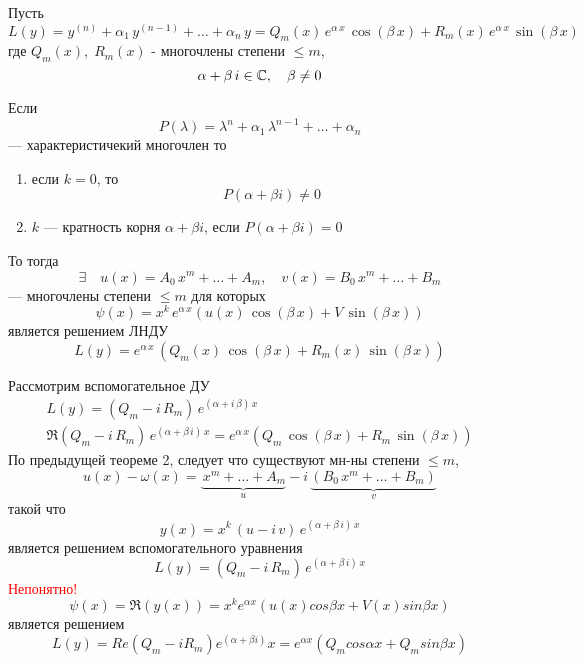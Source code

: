 \begin{Th}
    Пусть 
    \[
        L(y)=y^{(n)} + \alpha_1\,y^{(n-1)} + \dots +\alpha_n\,y=Q_m(x)\,e^{\alpha\,x}\,\cos(\beta\,x) + R_m(x)\,e^{\alpha\,x}\,\sin(\beta\,x)
    \] 
    где $Q_m(x),\; R_m(x)$ - многочлены степени $\leqslant m$, 
    \[
        \alpha + \beta\,i \in \mathbb{C},\quad \beta \neq 0
    \]
    
    Если 
    \[
        P(\lambda) = \lambda^n + \alpha_1\,\lambda^{n-1} + \dots + \alpha_n
    \] 
    --- характеристичекий многочлен то
    \begin{enumerate}
        \item[\textbullet] если $k=0$, то
        \[
            P(\alpha + \beta i) \neq 0
        \] 
                
        \item[\textbullet] $k$ --- кратность корня $\alpha + \beta i$, если $P(\alpha + \beta i) = 0$
    \end{enumerate}
	То тогда 
    \[
        \exists \quad u(x)= A_0\,x^m + \dots + A_m, \quad v(x) = B_0\,x^m + \dots + B_m 
    \]
    --- многочлены степени $\leqslant m$ для которых 
    \[
        \psi(x) = x^k\,e^{\alpha\,x}(u(x)\,\cos(\beta\,x) + V\,\sin(\beta\,x))
    \]
    является решением ЛНДУ 
    \[
        L(y) = e^{\alpha\,x}\,(Q_m(x)\,\cos(\beta\,x) + R_m(x)\,\sin(\beta\,x))
    \]
\end{Th}

\begin{Proof}
    Рассмотрим вспомогательное ДУ 
    \begin{gather*}
        L(y) = (Q_m - i\,R_m)\,e^{(\alpha + i\,\beta)\,x}\\
        \Re (Q_m - i\,R_m)\,e^{(\alpha + \beta\,i)\,x} = e^{\alpha\,x}(Q_m\,\cos(\beta\,x) + R_m\,\sin(\beta\,x))
    \end{gather*}
    По предыдущей теореме 2, следует что существуют мн-ны степени $\leqslant m$,
    \[
        u(x) - \omega(x) = \underbrace{\,x^m + \dots + A_m}_{u} - i\,\underbrace{(B_0\,x^m + \dots + B_m)}_{v}
    \]
    такой что
    \begin{equation*}
        y(x) = x^k\,(u - i\,v)\,e^{(\alpha + \beta\,i)\,x}
    \end{equation*}
    является решением вспомогательного уравнения
    \[
        L(y) = (Q_m - i\,R_m)\,e^{(\alpha + \beta\,i)\,x}
    \]
    \textcolor{red}{Непонятно!}\\
    \[
        \psi(x) = \Re(y(x)) = x^ke^{\alpha x}(u(x)cos\beta x + V(x)sin \beta x)
    \] 
    является решением\\
    \[
        L(y) = Re(Q_m - iR_m)e^{(\alpha + \beta i)}x = e^{\alpha x}(Q_m cos \alpha x + Q_m sin \beta x)
    \]   
\end{Proof}

